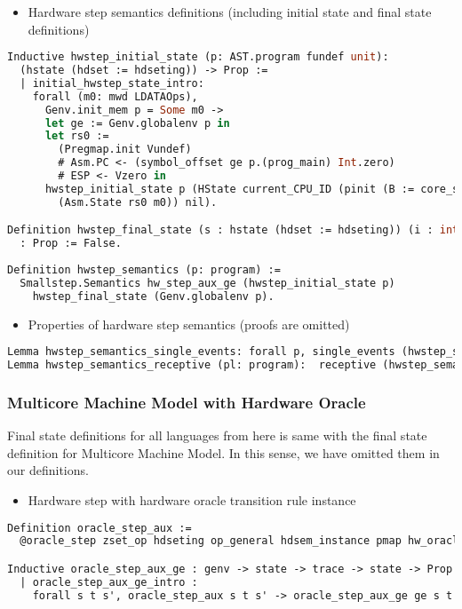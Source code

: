 \begin{itemize}[leftmargin=*]
\item Hardware step semantics definitions (including initial state and final state definitions)
\end{itemize}
\begin{lstlisting}[language=Caml]    
Inductive hwstep_initial_state (p: AST.program fundef unit): 
  (hstate (hdset := hdseting)) -> Prop := 
  | initial_hwstep_state_intro: 
    forall (m0: mwd LDATAOps),
      Genv.init_mem p = Some m0 ->
      let ge := Genv.globalenv p in
      let rs0 :=
        (Pregmap.init Vundef)
        # Asm.PC <- (symbol_offset ge p.(prog_main) Int.zero)
        # ESP <- Vzero in
      hwstep_initial_state p (HState current_CPU_ID (pinit (B := core_set)
        (Asm.State rs0 m0)) nil).

Definition hwstep_final_state (s : hstate (hdset := hdseting)) (i : int) 
  : Prop := False.
      
Definition hwstep_semantics (p: program) :=
  Smallstep.Semantics hw_step_aux_ge (hwstep_initial_state p) 
    hwstep_final_state (Genv.globalenv p).
\end{lstlisting}
    
\begin{itemize}[leftmargin=*]
\item Properties of hardware step semantics (proofs are omitted)
\end{itemize}
\begin{lstlisting}[language=Caml]    
Lemma hwstep_semantics_single_events: forall p, single_events (hwstep_semantics p).
Lemma hwstep_semantics_receptive (pl: program):  receptive (hwstep_semantics pl).
\end{lstlisting}

\subsubsection{Multicore Machine Model with Hardware Oracle}

Final state definitions for all languages from here is same with the final state definition for Multicore Machine Model. In this sense, 
we have omitted them in our definitions. 

\begin{itemize}[leftmargin=*]
\item Hardware step with hardware oracle transition rule instance
\end{itemize}
\begin{lstlisting}[language=Caml]
Definition oracle_step_aux :=
  @oracle_step zset_op hdseting op_general hdsem_instance pmap hw_oracle.

Inductive oracle_step_aux_ge : genv -> state -> trace -> state -> Prop :=
  | oracle_step_aux_ge_intro : 
    forall s t s', oracle_step_aux s t s' -> oracle_step_aux_ge ge s t s'.
\end{lstlisting}

